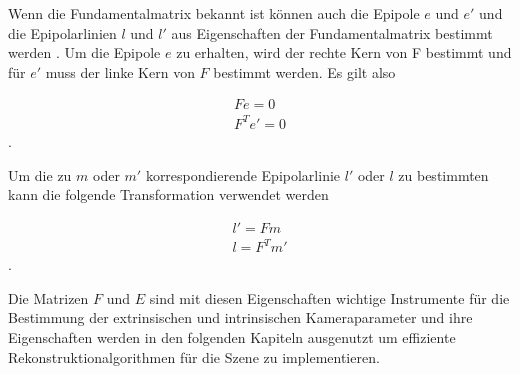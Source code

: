 
Wenn die Fundamentalmatrix bekannt ist können auch die Epipole $e$ und $e'$ und die Epipolarlinien $l$ und $l'$ aus Eigenschaften der Fundamentalmatrix bestimmt werden \cite{HZ,phdTwoView,HZ8,ZZGXr,phdextrinsicPara}. Um die Epipole $e$ zu erhalten, wird der rechte Kern von F bestimmt und für $e'$ muss der linke Kern von $F$ bestimmt werden\cite{HZ,phdTwoView,HZ8,ZZGXr,phdextrinsicPara}. Es gilt also%

\begin{gather}
	Fe = 0\\
	F^Te' = 0
\end{gather}.

Um die zu $m$ oder $m'$ korrespondierende Epipolarlinie $l'$ oder $l$ zu bestimmten kann die folgende Transformation verwendet werden\cite{HZ,phdTwoView,HZ8,ZZGXr,phdextrinsicPara}%

\begin{gather}
	l' = Fm\\
	l = F^Tm'
\end{gather}. 

Die Matrizen $F$ und $E$ sind mit diesen Eigenschaften wichtige Instrumente für die Bestimmung der extrinsischen und intrinsischen Kameraparameter und ihre Eigenschaften werden in den folgenden Kapiteln ausgenutzt um effiziente Rekonstruktionalgorithmen für die Szene zu implementieren. 




